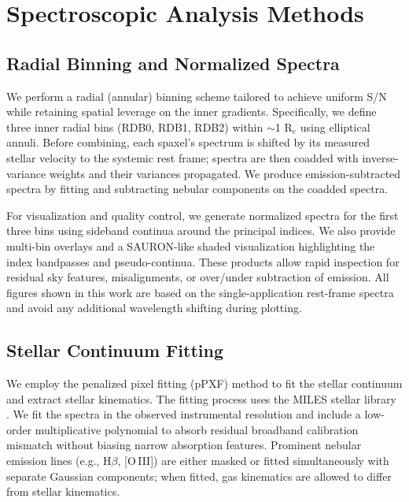 \documentclass[linenumbers,trackchanges,twocolumn]{aastex631}
\begin{document}
\section{Spectroscopic Analysis Methods}

\subsection{Radial Binning and Normalized Spectra}

We perform a radial (annular) binning scheme tailored to achieve uniform S/N while retaining spatial leverage on the inner gradients. Specifically, we define three inner radial bins (RDB0, RDB1, RDB2) within $\sim$1 R$_e$ using elliptical annuli. Before combining, each spaxel's spectrum is shifted by its measured stellar velocity to the systemic rest frame; spectra are then coadded with inverse-variance weights and their variances propagated. We produce emission-subtracted spectra by fitting and subtracting nebular components on the coadded spectra.

For visualization and quality control, we generate normalized spectra for the first three bins using sideband continua around the principal indices. We also provide multi-bin overlays and a SAURON-like shaded visualization highlighting the index bandpasses and pseudo-continua. These products allow rapid inspection for residual sky features, misalignments, or over/under subtraction of emission. All figures shown in this work are based on the single-application rest-frame spectra and avoid any additional wavelength shifting during plotting.

\subsection{Stellar Continuum Fitting}

We employ the penalized pixel fitting (pPXF) method \citep{Cappellari2004, Cappellari2017} to fit the stellar continuum and extract stellar kinematics. The fitting process uses the MILES stellar library \citep{SanchezBlazquez2006}. We fit the spectra in the observed instrumental resolution and include a low-order multiplicative polynomial to absorb residual broadband calibration mismatch without biasing narrow absorption features. Prominent nebular emission lines (e.g., H$\beta$, [O\,III]) are either masked or fitted simultaneously with separate Gaussian components; when fitted, gas kinematics are allowed to differ from stellar kinematics.
\end{document}
